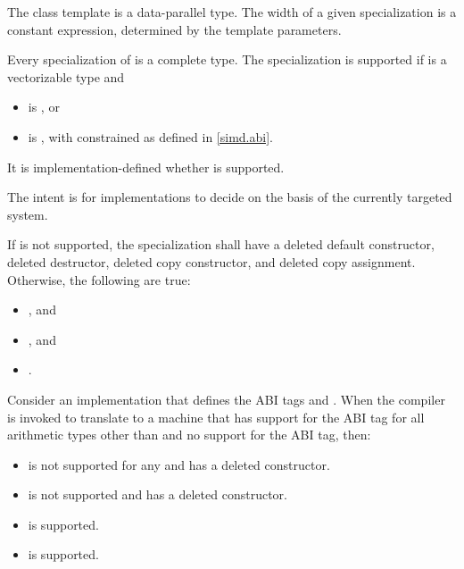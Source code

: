 \pnum
The class template  is a data-parallel type. The width of a given  specialization is a constant expression, determined by the template parameters.

\pnum
Every specialization of  is a complete type. The specialization  is supported if  is a vectorizable type and
\begin{itemize}
  \item {} is , or
  \item {} is , with  constrained as defined in \ref{simd.abi}.
\end{itemize}

It is implementation-defined whether  is supported.
\begin{note}
The intent is for implementations to decide on the basis of the currently
targeted system.
\end{note}

If  is not supported, the specialization shall have a deleted default constructor, deleted destructor, deleted copy constructor, and deleted copy assignment.
Otherwise, the following are true:
\begin{itemize}
  \item {}, and
  \item {}, and
  \item {}.
\end{itemize}

\begin{example}
  Consider an implementation that defines the ABI tags  and . When the compiler is invoked to translate to a machine that has support for the  ABI tag for all arithmetic types other than  and no support for the  ABI tag, then:
  \begin{itemize}
    \item {} is not supported for any  and has a deleted constructor.
    \item {} is not supported and has a deleted constructor.
    \item {} is supported.
    \item {} is supported.
  \end{itemize}
\end{example}

